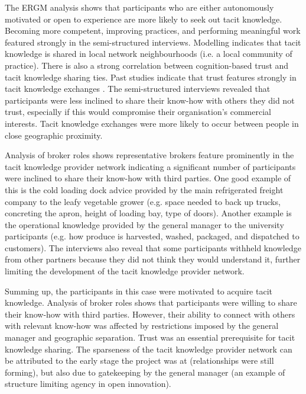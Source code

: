 The ERGM analysis shows that participants who are either autonomously motivated or open to experience are more likely to seek out tacit knowledge. Becoming more competent, improving practices, and performing meaningful work featured strongly in the semi-structured interviews. Modelling indicates that tacit knowledge is shared in local network neighbourhoods (i.e. a local community of practice). There is also a strong correlation between cognition-based trust and tacit knowledge sharing ties. Past studies indicate that trust features strongly in tacit knowledge exchanges \citep[e.g.][]{kaser2001knowledge,lin2007share,zhang2016critical}. The semi-structured interviews revealed that participants were less inclined to share their know-how with others they did not trust, especially if this would compromise their organisation's commercial interests. Tacit knowledge exchanges were more likely to occur between people in close geographic proximity. \medskip

Analysis of broker roles shows representative brokers feature prominently in the tacit knowledge provider network indicating a significant number of participants were inclined to share their know-how with third parties. One good example of this is the cold loading dock advice provided by the main refrigerated freight company to the leafy vegetable grower (e.g. space needed to back up trucks, concreting the apron, height of loading bay, type of doors). Another example is the operational knowledge provided by the general manager to the university participants (e.g. how produce is harvested, washed, packaged, and dispatched to customers). The interviews also reveal that some participants withheld knowledge from other partners because they did not think they would understand it, further limiting the development of the tacit knowledge provider network. \medskip

Summing up, the participants in this case were motivated to acquire tacit knowledge. Analysis of broker roles shows that participants were willing to share their know-how with third parties. However, their ability to connect with others with relevant know-how was affected by restrictions imposed by the general manager and geographic separation. Trust was an essential prerequisite for tacit knowledge sharing. The sparseness of the tacit knowledge provider network can be attributed to the early stage the project was at (relationships were still forming), but also due to gatekeeping by the general manager (an example of structure limiting agency in open innovation).


